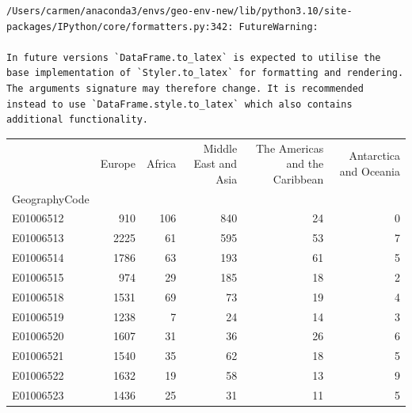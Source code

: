 \documentclass[
  letterpaper,
  DIV=11,
  numbers=noendperiod]{scrreprt}
\begin{document}
\begin{verbatim}
/Users/carmen/anaconda3/envs/geo-env-new/lib/python3.10/site-packages/IPython/core/formatters.py:342: FutureWarning:

In future versions `DataFrame.to_latex` is expected to utilise the base implementation of `Styler.to_latex` for formatting and rendering. The arguments signature may therefore change. It is recommended instead to use `DataFrame.style.to_latex` which also contains additional functionality.
\end{verbatim}

\begin{tabular}{lrrrrr}
\toprule
{} &  Europe &  Africa &  Middle East and Asia &  The Americas and the Caribbean &  Antarctica and Oceania \\
GeographyCode &         &         &                       &                                 &                         \\
\midrule
E01006512     &     910 &     106 &                   840 &                              24 &                       0 \\
E01006513     &    2225 &      61 &                   595 &                              53 &                       7 \\
E01006514     &    1786 &      63 &                   193 &                              61 &                       5 \\
E01006515     &     974 &      29 &                   185 &                              18 &                       2 \\
E01006518     &    1531 &      69 &                    73 &                              19 &                       4 \\
E01006519     &    1238 &       7 &                    24 &                              14 &                       3 \\
E01006520     &    1607 &      31 &                    36 &                              26 &                       6 \\
E01006521     &    1540 &      35 &                    62 &                              18 &                       5 \\
E01006522     &    1632 &      19 &                    58 &                              13 &                       9 \\
E01006523     &    1436 &      25 &                    31 &                              11 &                       5 \\

\end{tabular}
\end{document}
